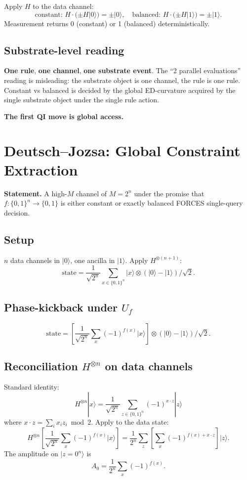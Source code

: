 \documentclass[11pt,a4paper]{article}
\begin{document}
Apply $H$ to the data channel:
\[
\text{constant: } H \cdot (\pm H|0\rangle) = \pm |0\rangle, \quad \text{balanced: } H \cdot (\pm H|1\rangle) = \pm |1\rangle.
\]
Measurement returns 0 (constant) or 1 (balanced) deterministically.

\subsection{Substrate-level reading}

\textbf{One rule}, \textbf{one channel}, \textbf{one substrate event}. The ``2 parallel evaluations'' reading is misleading: the substrate object is one channel, the rule is one rule. Constant vs balanced is decided by the global ED-curvature acquired by the single substrate object under the single rule action.

\textbf{The first QI move is global access.}

\section{Deutsch--Jozsa: Global Constraint Extraction}

\textbf{Statement.} A high-$M$ channel of $M = 2^n$ under the promise that $f: \{0,1\}^n \to \{0,1\}$ is either constant or exactly balanced FORCES single-query decision.

\subsection{Setup}

$n$ data channels in $|0\rangle$, one ancilla in $|1\rangle$. Apply $H^{\otimes(n+1)}$:
\[
\text{state} = \frac{1}{\sqrt{2^n}}\sum_{x \in \{0,1\}^n}|x\rangle \otimes (|0\rangle - |1\rangle)/\sqrt{2}.
\]

\subsection{Phase-kickback under $U_f$}

\[
\text{state} = \left[\frac{1}{\sqrt{2^n}}\sum_x (-1)^{f(x)}|x\rangle\right] \otimes (|0\rangle - |1\rangle)/\sqrt{2}.
\]

\subsection{Reconciliation $H^{\otimes n}$ on data channels}

Standard identity:
\[
H^{\otimes n}|x\rangle = \frac{1}{\sqrt{2^n}}\sum_{z \in \{0,1\}^n}(-1)^{x\cdot z}|z\rangle
\]
where $x\cdot z = \sum_i x_i z_i \bmod 2$. Apply to the data state:
\[
H^{\otimes n}\left[\frac{1}{\sqrt{2^n}}\sum_x (-1)^{f(x)}|x\rangle\right] = \frac{1}{2^n}\sum_z\left[\sum_x (-1)^{f(x) + x\cdot z}\right]|z\rangle.
\]
The amplitude on $|z = 0^n\rangle$ is
\[
A_0 = \frac{1}{2^n}\sum_x (-1)^{f(x)}.
\]
\end{document}
